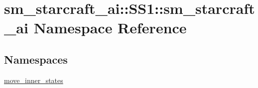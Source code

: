 \hypertarget{namespacesm__starcraft__ai_1_1SS1_1_1sm__starcraft__ai}{}\section{sm\+\_\+starcraft\+\_\+ai\+:\+:S\+S1\+:\+:sm\+\_\+starcraft\+\_\+ai Namespace Reference}
\label{namespacesm__starcraft__ai_1_1SS1_1_1sm__starcraft__ai}
\subsection*{Namespaces}
\begin{DoxyCompactItemize}
\item 
 \hyperlink{namespacesm__starcraft__ai_1_1SS1_1_1sm__starcraft__ai_1_1move__inner__states}{move\+\_\+inner\+\_\+states}
\end{DoxyCompactItemize}
